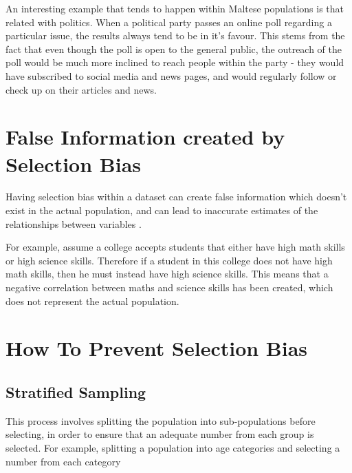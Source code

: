     
    An interesting example that tends to happen within Maltese populations is that related with politics. When a political party passes an online poll regarding a particular issue, the results always tend to be in it's favour. This stems from the fact that even though the poll is open to the general public, the outreach of the poll would be much more inclined to reach people within the party - they would have subscribed to social media and news pages, and would regularly follow or check up on their articles and news.
    
    \section{False Information created by Selection Bias}
    
	Having selection bias within a dataset can create false information which doesn't exist in the actual population, and can lead to inaccurate estimates of the relationships between variables \citep{CuddebackEtAl2004}.
	
	For example, assume a college accepts students that either have high math skills or high science skills. Therefore if a student in this college does not have high math skills, then he must instead have high science skills. This means that a negative correlation between maths and science skills has been created, which does not represent the actual population.
	
	
	\section{How To Prevent Selection Bias}
	
	\subsection{Stratified Sampling}
	
	This process involves splitting the population into sub-populations before selecting, in order to ensure that an adequate number from each group is selected. For example, splitting a population into age categories and selecting a number from each category \citep{KrautenbacherEtAl2017}
	
